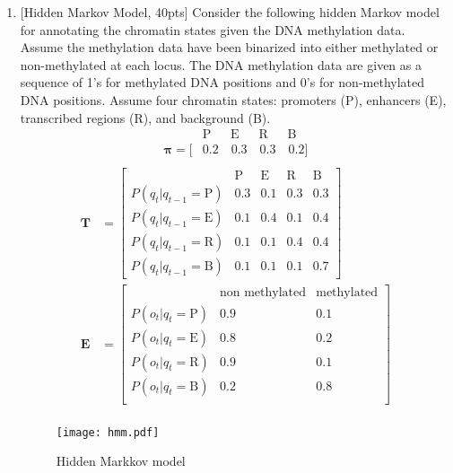 \documentclass[11pt]{article}
\begin{document}
\begin{enumerate}





\item {[Hidden Markov Model, 40pts]} Consider the following hidden Markov model for annotating the chromatin states given the DNA methylation data. 
Assume the methylation data have been binarized into either methylated or non-methylated at each locus.
The DNA methylation data are given as a sequence of 1's for methylated DNA positions and 0's for non-methylated DNA positions.
Assume four chromatin states: promoters (P), enhancers (E), transcribed regions (R), and background (B).
\begin{align*}
	     &  \text{P}\quad\;\;\text{E}\quad\;\;\text{R}\quad\;\;\text{B} \\
\mathbf{\pi} = [&0.2 \quad 0.3 \quad 0.3 \quad  0.2] \\
\end{align*}
\vspace{-20pt}
\begin{align*}
\mathbf{T} &= \begin{bmatrix}
				&  \text{P} & \text{E} & \text{R} & \text{B} \\
P(q_t|q_{t-1}=\text{P}) 	&  0.3 	& 0.1 	& 0.3 	&  0.3 \\
P(q_t|q_{t-1}=\text{E}) 	&  0.1 	& 0.4 	& 0.1 	&  0.4 \\
P(q_t|q_{t-1}=\text{R}) 	&  0.1 	& 0.1 	& 0.4 	&  0.4 \\ 
P(q_t|q_{t-1}=\text{B}) 	&  0.1 	& 0.1 	& 0.1 	&  0.7 
\end{bmatrix} \\
\mathbf{E} &= \begin{bmatrix}
			&   \text{non methylated} & \text{methylated} \\
P(o_t|q_{t}=\text{P}) 	&  0.9 	& 0.1 	\\
P(o_t|q_{t}=\text{E}) 	&  0.8 	& 0.2 	\\
P(o_t|q_{t}=\text{R}) 	&  0.9 	& 0.1 	\\
P(o_t|q_{t}=\text{B}) 	&  0.2 	& 0.8 	\\
\end{bmatrix} \\
\end{align*}

\begin{figure}[h!]
    \centering
\vspace{-80pt}
    \texttt{[image: hmm.pdf]}
\label{fig:hmm}
\vspace{-80pt}
\caption{Hidden Markkov model}
\end{figure}


\end{enumerate}
\end{document}

